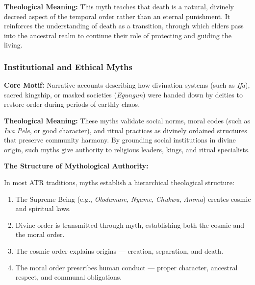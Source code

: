 \documentclass[12pt,a4paper]{article}
\begin{document}
\textbf{Theological Meaning:} This myth teaches that death is a natural, divinely decreed aspect of the temporal order rather than an eternal punishment. It reinforces the understanding of death as a transition, through which elders pass into the ancestral realm to continue their role of protecting and guiding the living.

\subsubsection{Institutional and Ethical Myths}

\textbf{Core Motif:} Narrative accounts describing how divination systems (such as \textit{Ifa}), sacred kingship, or masked societies (\textit{Egungun}) were handed down by deities to restore order during periods of earthly chaos.

\textbf{Theological Meaning:} These myths validate social norms, moral codes (such as \textit{Iwa Pele}, or good character), and ritual practices as divinely ordained structures that preserve community harmony. By grounding social institutions in divine origin, such myths give authority to religious leaders, kings, and ritual specialists.

\begin{example}
\textbf{The Structure of Mythological Authority:}

In most ATR traditions, myths establish a hierarchical theological structure:
\begin{enumerate}
    \item The Supreme Being (e.g., \textit{Olodumare}, \textit{Nyame}, \textit{Chukwu}, \textit{Amma}) creates cosmic and spiritual laws.
    \item Divine order is transmitted through myth, establishing both the cosmic and the moral order.
    \item The cosmic order explains origins --- creation, separation, and death.
    \item The moral order prescribes human conduct --- proper character, ancestral respect, and communal obligations.
\end{enumerate}
\end{example}
\end{document}
